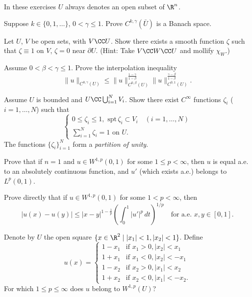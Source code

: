 In these exercises $U$ always denotes an open subset of $\R^n$.

\begin{exercise}
Suppose $k \in \{0,1,\ldots\}$, $0 < \gamma \le 1$. Prove $C^{k,\gamma}(\bar U)$ is a Banach space.
\end{exercise}

\begin{exercise}
Let $U$, $V$ be open sets, with $V \CC U$. Show there exists a smooth function $\zeta$ such that $\zeta \equiv 1$ on $V$, $\zeta = 0$ near $\partial U$. (Hint: Take $V \CC W \CC U$ and mollify $\chi_W$.)
\end{exercise}

\begin{exercise}
Assume $0 < \beta < \gamma \le 1$. Prove the interpolation inequality
$$\|u\|_{C^{0,\gamma}(U)} \le \|u\|^{\frac{1-\gamma}{1-\beta}}_{C^{0,\beta}(U)} \|u\|^{\frac{\gamma-\beta}{1-\beta}}_{C^{0,1}(U)}.$$
\end{exercise}

\begin{exercise}
Assume $U$ is bounded and $U \CC \bigcup_{i=1}^N V_i$. Show there exist $C^\infty$ functions $\zeta_i$ ($i = 1, \ldots, N$) such that
$$\begin{cases}
0 \le \zeta_i \le 1, \text{ spt}\,\zeta_i \subset V_i \quad (i = 1, \ldots, N) \\
\sum_{i=1}^N \zeta_i = 1 \text{ on } U.
\end{cases}$$
The functions $\{\zeta_i\}_{i=1}^N$ form a \textit{partition of unity}.
\end{exercise}

\begin{exercise}
Prove that if $n = 1$ and $u \in W^{1,p}(0,1)$ for some $1 \le p < \infty$, then $u$ is equal a.e. to an absolutely continuous function, and $u'$ (which exists a.e.) belongs to $L^p(0,1)$.
\end{exercise}

\begin{exercise}
Prove directly that if $u \in W^{1,p}(0,1)$ for some $1 < p < \infty$, then
$$|u(x) - u(y)| \le |x - y|^{1-\frac{1}{p}} \left(\int_0^1 |u'|^p\,dt\right)^{1/p} \quad \text{for a.e. } x, y \in [0,1].$$
\end{exercise}

\begin{exercise}
Denote by $U$ the open square $\{x \in \R^2 \mid |x_1| < 1, |x_2| < 1\}$. Define
$$u(x) = \begin{cases}
1 - x_1 & \text{if } x_1 > 0, |x_2| < x_1 \\
1 + x_1 & \text{if } x_1 < 0, |x_2| < -x_1 \\
1 - x_2 & \text{if } x_2 > 0, |x_1| < x_2 \\
1 + x_2 & \text{if } x_2 < 0, |x_1| < -x_2.
\end{cases}$$
For which $1 \le p \le \infty$ does $u$ belong to $W^{1,p}(U)$?
\end{exercise}

